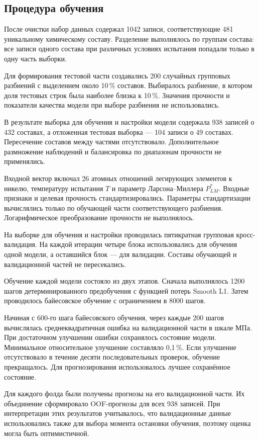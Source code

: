 \subsection{Процедура обучения}

После очистки набор данных содержал 1042 записи,
соответствующие 481 уникальному химическому составу.
Разделение выполнялось по группам состава: все записи
одного состава при различных условиях испытания
попадали только в одну часть выборки.

Для формирования тестовой части создавались
200 случайных групповых разбиений с выделением
около 10\,\% составов. Выбиралось разбиение,
в котором доля тестовых строк была наиболее
близка к 10\,\%. Значения прочности и показатели
качества модели при выборе разбиения не использовались.

В результате выборка для обучения и настройки модели
содержала 938 записей о 432 составах,
а отложенная тестовая выборка --- 104 записи
о 49 составах. Пересечение составов между частями
отсутствовало. Дополнительное размножение наблюдений
и балансировка по диапазонам прочности не применялись.

Входной вектор включал 26 атомных отношений
легирующих элементов к никелю, температуру испытания
$T$ и параметр Ларсона--Миллера $P_{LM}^{*}$.
Входные признаки и целевая прочность стандартизировались.
Параметры стандартизации вычислялись только
по обучающей части соответствующего разбиения.
Логарифмическое преобразование прочности не выполнялось.

На выборке для обучения и настройки проводилась
пятикратная групповая кросс-валидация.
На каждой итерации четыре блока использовались
для обучения одной модели, а оставшийся блок ---
для валидации. Составы обучающей и валидационной
частей не пересекались.

Обучение каждой модели состояло из двух этапов.
Сначала выполнялось 1200 шагов детерминированного
предобучения с функцией потерь Smooth L1.
Затем проводилось байесовское обучение с
ограничением в 8000 шагов.

Начиная с 600-го шага байесовского обучения,
через каждые 200 шагов вычислялась среднеквадратичная
ошибка на валидационной части в шкале МПа.
При достаточном улучшении ошибки сохранялось
состояние модели. Минимальное относительное
улучшение составляло 0,1\,\%.
Если улучшение отсутствовало в течение десяти
последовательных проверок, обучение прекращалось.
Для прогнозирования использовалось лучшее
сохранённое состояние.

Для каждого фолда были получены прогнозы
на его валидационной части. Их объединение
сформировало OOF-прогнозы для всех 938 записей.
При интерпретации этих результатов учитывалось,
что валидационные данные использовались также
для выбора момента остановки обучения,
поэтому оценка могла быть оптимистичной.

